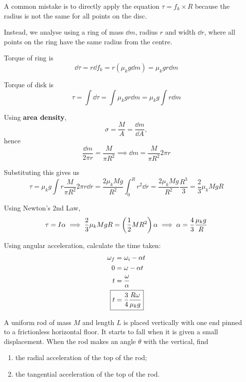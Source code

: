 \begin{solution}
A common mistake is to directly apply the equation $\tau=f_k\times R$ because the radius is not the same for all points on the disc.

Instead, we analyse using a ring of mass $\dd{m}$, radius $r$ and width $\dd{r}$, where all points on the ring have the same radius from the centre.

Torque of ring is
\[ \dd{\tau} = r \dd{f_k} = r(\mu_k g \dd{m}) = \mu_k g r \dd{m} \]

Torque of disk is
\[ \tau = \int \dd{\tau} = \int \mu_k g r \dd{m} = \mu_k g \int r \dd{m} \]

Using \textbf{area density}, 
\[ \sigma = \frac{M}{A} = \frac{\dd{m}}{\dd{A}}, \]
hence
\[ \frac{\dd{m}}{2\pi r}=\frac{M}{\pi R^2} \implies \dd{m} = \frac{M}{\pi R^2}2\pi r \]

Substituting this gives us 
\[ \tau = \mu_k g \int r \frac{M}{\pi R^2}2\pi r \dd{r} = \frac{2\mu_kMg}{R^2}\int_0^R r^2 \dd{r} = \frac{2\mu_kMg}{R^2} \frac{R^3}{3} = \boxed{\frac{2}{3}\mu_kMgR} \]

Using Newton's 2nd Law,
\[ \tau = I\alpha \implies \frac{2}{3}\mu_kMgR = \left(\frac{1}{2}MR^2\right)\alpha \implies \alpha = \frac{4}{3}\frac{\mu_kg}{R} \]

Using angular acceleration, calculate the time taken:
\begin{align*}
\omega_f &= \omega_i-\alpha t \\
0 &= \omega - \alpha t \\
t &= \frac{\omega}{\alpha} \\
\Aboxed{t &= \frac{3}{4}\frac{R\omega}{\mu_kg}}
\end{align*}
\end{solution}
\pagebreak

\begin{exmp}{}{}
A uniform rod of mass $M$ and length $L$ is placed vertically with one end pinned to a frictionless horizontal floor. It starts to fall when it is given a small displacement. When the rod makes an angle $\theta$ with the vertical, find
\begin{enumerate}[label=(\alph*)]
\item the radial acceleration of the top of the rod;
\item the tangential acceleration of the top of the rod.
\end{enumerate}
\end{exmp}

